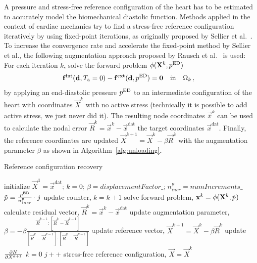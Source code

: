 A pressure and stress-free reference configuration of the heart has to be estimated to accurately model the biomechanical diastolic function.
Methods applied in the context of cardiac mechanics try to find a stress-free reference configuration iteratively by using fixed-point iterations, as originally proposed by Sellier et al.~\cite{Sellier-2011-ID12486}.
To increase the convergence rate and accelerate the fixed-point method by Sellier et al., the following augmentation approach  proposed by Rausch et al.~\cite{Rausch-2017} is used:
For each iteration $k$, solve the forward problem $\phi(\vec X^k, \p{}^\mathrm{ED})$
\begin{align}
\vec f^\mathrm{int}(\d, \Ta = 0) - \vec f^\mathrm{ext}(\d, \p{}^\mathrm{ED})  = \vec 0 \qq{in} \Omega_k \,, \label{eq:forwardMechanics}
\end{align}
by applying an end-diastolic pressure $p_\mathrm{}^\mathrm{ED}$ to an intermediate configuration of the heart with coordinates $\vec X^k$ with no active stress (technically it is possible to add active stress, we just never did it).
The resulting node coordinates $\vec x^k$ can be used to calculate the nodal error $\vec R^k = \vec x^k - \vec x^\mathrm{dat}$ \wrt the target coordinates $\vec x^\mathrm{dat}$.
Finally, the reference coordinates are updated $\vec X^{k+1} = \vec X^k - \beta \vec R^k$ with the augmentation parameter $\beta$ as shown in Algorithm~\ref{alg:unloading}.
\begin{algorithm}
\caption{Reference configuration recovery }\label{alg:unloading}
\begin{algorithmic}[1]
\State initialize $\vec X^1 = \vec x^\mathrm{dat}$; $k = 0$; $\beta = displacementFactor\_$; $n^p_{incr} = numIncrements\_$
\State $\Tilde{p_\mathrm{}} = \frac{p_\mathrm{}^\mathrm{ED}}{n^p_{incr}} \cdot j$
\State update counter, $k = k + 1$
\State solve forward problem, $\vec x^k = \phi(\vec X^k,\Tilde{\p{}})$
\State calculate residual vector, $\vec R^k = \vec x^k - \vec x^\mathrm{dat}$
\State update augmentation parameter, $\beta = - \beta \frac{\vec R^{k-1} \colon [\vec R^k - \vec R^{k-1}]}{[\vec R^k - \vec R^{k-1}]\colon [\vec R^k - \vec R^{k-1}]}$
\EndIf
\State update reference vector, $\vec X^{k+1} = \vec X^k - \beta \vec R^k$
\State update $\pdv{N}{X^{k+1}}$
\EndWhile
\State $k = 0$
\State $j++$
\EndFor
\State\Return stress-free reference configuration, $\vec X = \vec X^k$
\EndProcedure
\end{algorithmic}
\end{algorithm}

